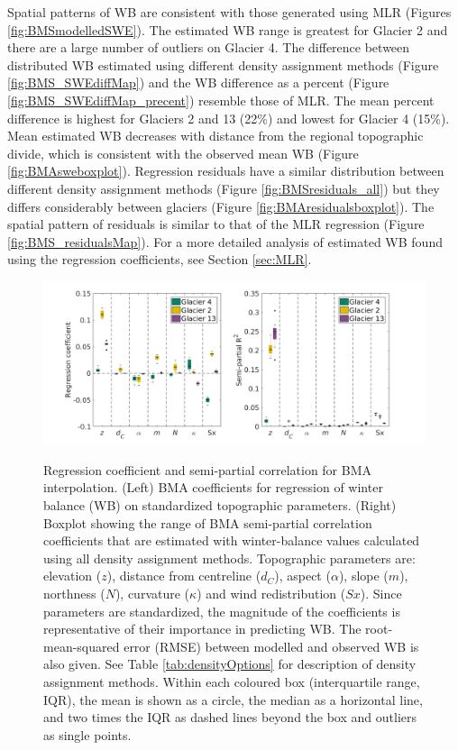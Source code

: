 \documentclass{sfuthesis}
\newcommand{\params}{Topographic parameters are: elevation ($z$), distance from centreline ($d_C$), aspect ($\alpha$), slope ($m$), northness ($N$), curvature ($\kappa$) and wind redistribution ($Sx$). }
\newcommand{\boxplot}{Within each coloured box (interquartile range, IQR), the mean is shown as a circle, the median as a horizontal line, and two times the IQR as dashed lines beyond the box and outliers as single points. }
\begin{document}
Spatial patterns of WB are consistent with those generated using MLR (Figures \ref{fig:BMSmodelledSWE}). The estimated WB range is greatest for Glacier 2 and there are a large number of outliers on Glacier 4. The difference between distributed WB estimated using different density assignment methods (Figure \ref{fig:BMS_SWEdiffMap}) and the WB difference as a percent (Figure \ref{fig:BMS_SWEdiffMap_precent}) resemble those of MLR. The mean percent difference is highest for Glaciers 2 and 13 (22\%) and lowest for Glacier 4 (15\%). Mean estimated WB decreases with distance from the regional topographic divide, which is consistent with the observed mean WB (Figure \ref{fig:BMAsweboxplot}). Regression residuals have a similar distribution between different density assignment methods (Figure \ref{fig:BMSresiduals_all}) but they differs considerably between glaciers (Figure \ref{fig:BMAresidualsboxplot}). The spatial pattern of residuals is similar to that of the MLR regression (Figure \ref{fig:BMS_residualsMap}). For a more detailed analysis of estimated WB found using the regression coefficients, see Section \ref{sec:MLR}. 

\begin{figure}[H]
	\centering
	\includegraphics[width =1.1 \textwidth]{BMSsemiR2_DensityOpts.png}\\
	\caption[Regression coefficient and semi-partial correlation for BMA interpolation]{Regression coefficient and semi-partial correlation for BMA interpolation. (Left) BMA coefficients for regression of winter balance (WB) on standardized topographic parameters. (Right) Boxplot showing the range of BMA semi-partial correlation coefficients that are estimated with winter-balance values calculated using all density assignment methods. \params  Since parameters are standardized, the magnitude of the coefficients is representative of their importance in predicting WB. The root-mean-squared error (RMSE) between modelled and observed WB is also given. See Table \ref{tab:densityOptions} for description of density assignment methods. \boxplot }
	\label{fig:BMAsemiR2_densityOptions}
\end{figure} 
 
\end{document}
